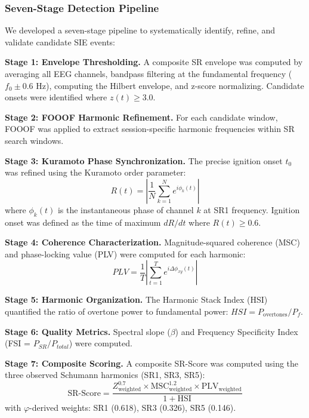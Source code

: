 \documentclass[11pt,a4paper]{article}
\newcommand{\phisym}{\varphi}
\begin{document}
\subsubsection{Seven-Stage Detection Pipeline}

We developed a seven-stage pipeline to systematically identify, refine, and validate candidate SIE events:

\textbf{Stage 1: Envelope Thresholding.}
A composite SR envelope was computed by averaging all EEG channels, bandpass filtering at the fundamental frequency ($f_0 \pm 0.6$ Hz), computing the Hilbert envelope, and z-score normalizing. Candidate onsets were identified where $z(t) \geq 3.0$.

\textbf{Stage 2: FOOOF Harmonic Refinement.}
For each candidate window, FOOOF was applied to extract session-specific harmonic frequencies within SR search windows.

\textbf{Stage 3: Kuramoto Phase Synchronization.}
The precise ignition onset $t_0$ was refined using the Kuramoto order parameter:
\begin{equation}
R(t) = \left| \frac{1}{N} \sum_{k=1}^{N} e^{i\phi_k(t)} \right|
\end{equation}
where $\phi_k(t)$ is the instantaneous phase of channel $k$ at SR1 frequency. Ignition onset was defined as the time of maximum $dR/dt$ where $R(t) \geq 0.6$.

\textbf{Stage 4: Coherence Characterization.}
Magnitude-squared coherence (MSC) and phase-locking value (PLV) \parencite{lachaux1999plv} were computed for each harmonic:
\begin{equation}
PLV = \frac{1}{T}\left|\sum_{t=1}^{T} e^{i\Delta\phi_{xy}(t)}\right|
\end{equation}

\textbf{Stage 5: Harmonic Organization.}
The Harmonic Stack Index (HSI) quantified the ratio of overtone power to fundamental power: $HSI = P_{\text{overtones}} / P_f$.

\textbf{Stage 6: Quality Metrics.}
Spectral slope ($\beta$) and Frequency Specificity Index (FSI = $P_{SR}/P_{total}$) were computed.

\textbf{Stage 7: Composite Scoring.}
A composite SR-Score was computed using the three observed Schumann harmonics (SR1, SR3, SR5):
\begin{equation}
\text{SR-Score} = \frac{Z_{\text{weighted}}^{0.7} \times \text{MSC}_{\text{weighted}}^{1.2} \times \text{PLV}_{\text{weighted}}}{1 + \text{HSI}}
\end{equation}
with $\phisym$-derived weights: SR1 (0.618), SR3 (0.326), SR5 (0.146).
\end{document}
